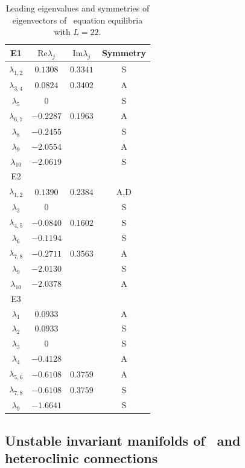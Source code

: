 \begin{table}[!ht]
\caption{\label{tab:E1_sym} Leading eigenvalues and symmetries
of eigenvectors of \KS\ equation equilibria with $L = 22$.}
{\small
\begin{tabular}{cccc} \hline
E1 & $\mathrm{Re} \lambda_j$ & $\mathrm{Im} \lambda_j$ & Symmetry \\\hline
  $\lambda_{1,2}$ & $0.1308$& $0.3341$ & S \\
  $\lambda_{3,4}$ & $0.0824$& $0.3402$ & A \\
  $\lambda_{5}$   & $0$     &          & S \\
  $\lambda_{6,7}$ &$-0.2287$& $0.1963$ & A \\
  $\lambda_{8}$   &$-0.2455$&          & S \\
  $\lambda_{9}$   &$-2.0554$&          & A \\
  $\lambda_{10}$  &$-2.0619$&          & S \\\hline
E2 &  &  & \\\hline
  $\lambda_{1,2}$ & $0.1390$ & $0.2384$ & A,D \\
  $\lambda_{3}$   & $0$      &          & S \\
  $\lambda_{4,5}$ &$-0.0840$ & $0.1602$ & S \\
  $\lambda_{6}$   &$-0.1194$ &          & S \\
  $\lambda_{7,8}$ &$-0.2711$ & $0.3563$ & A \\
  $\lambda_{9}$   &$-2.0130$ &          & S \\
  $\lambda_{10}$  &$-2.0378$ &          & A \\\hline
E3 &  &  & \\\hline
  $\lambda_{1}$   &$0.0933$  &          & A \\
  $\lambda_{2}$   &$0.0933$  &          & S \\
  $\lambda_{3}$   &$0$       &          & S \\
  $\lambda_{4}$   &$-0.4128$ &          & A \\
  $\lambda_{5,6}$ &$-0.6108$ & $0.3759$ & A \\
  $\lambda_{7,8}$ &$-0.6108$ & $0.3759$ & S \\
  $\lambda_{9}$   &$-1.6641$ &          & S \\\hline
\end{tabular}}
\end{table}


\subsection{Unstable invariant manifolds of \eqva\ and heteroclinic
connections}

